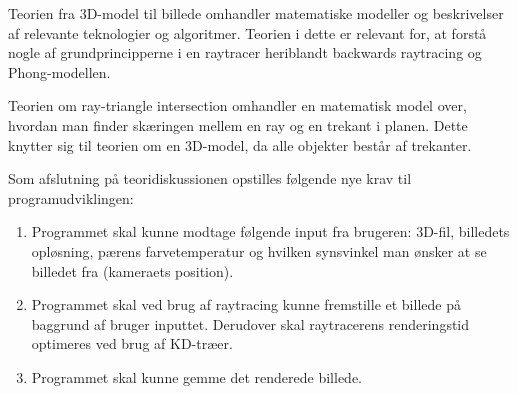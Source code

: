 Teorien fra 3D-model til billede omhandler matematiske modeller og beskrivelser af relevante teknologier og algoritmer. Teorien i dette er relevant for, at forstå nogle af grundprincipperne i en raytracer heriblandt backwards raytracing og Phong-modellen.

Teorien om ray-triangle intersection omhandler en matematisk model over, hvordan man finder skæringen mellem en ray og en trekant i planen. Dette knytter sig til teorien om en 3D-model, da alle objekter består af trekanter. 

Som afslutning på teoridiskussionen opstilles følgende nye krav til programudviklingen:
\begin{enumerate}
    \item Programmet skal kunne modtage følgende input fra brugeren: 3D-fil, billedets opløsning, pærens farvetemperatur og hvilken synsvinkel man ønsker at se billedet fra (kameraets position).
    \item Programmet skal ved brug af raytracing kunne fremstille et billede på baggrund af bruger inputtet. Derudover skal raytracerens renderingstid optimeres ved brug af KD-træer.
    \item Programmet skal kunne gemme det renderede billede.
\end{enumerate}